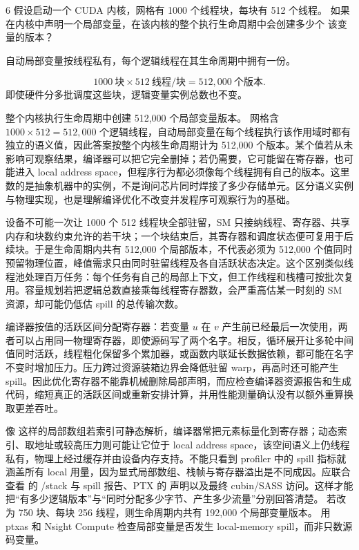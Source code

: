 \begin{solutionexercise}{6}
\problemheading 假设启动一个 CUDA 内核，网格有 1000 个线程块，每块有 512 个线程。
如果在内核中声明一个局部变量，在该内核的整个执行生命周期中会创建多少个
该变量的版本？

\approachheading 自动局部变量按线程私有，每个逻辑线程在其生命周期中拥有一份。

\answerheading
\[
1000\ \text{块}\times512\ \text{线程/块}=512{,}000\ \text{个版本}.
\]
即使硬件分多批调度这些块，逻辑变量实例总数也不变。

\conclusionheading 整个内核执行生命周期中创建 512,000 个局部变量版本。
\discussionheading
{}
网格含 $1000\times512=512{,}000$ 个逻辑线程，自动局部变量在每个线程执行该作用域时都有独立的语义值，因此答案按整个内核生命周期计为 512,000 个版本。某个值若从未影响可观察结果，编译器可以把它完全删掉；若仍需要，它可能留在寄存器，也可能进入 local address space，但程序行为都必须像每个线程拥有自己的版本。这里数的是抽象机器中的实例，不是询问芯片同时焊接了多少存储单元。区分语义实例与物理实现，也是理解编译优化不改变并发程序可观察行为的基础。

设备不可能一次让 1000 个 512 线程块全部驻留，SM 只接纳线程、寄存器、共享内存和块数约束允许的若干块；一个块结束后，其寄存器和调度状态便可复用于后续块。于是生命周期内共有 512,000 个局部版本，不代表必须为 512,000 个值同时预留物理位置，峰值需求只由同时驻留线程及各自活跃状态决定。这个区别类似线程池处理百万任务：每个任务有自己的局部上下文，但工作线程和栈槽可按批次复用。容量规划若把逻辑总数直接乘每线程寄存器数，会严重高估某一时刻的 SM 资源，却可能仍低估 spill 的总传输次数。

编译器按值的活跃区间分配寄存器：若变量 $u$ 在 $v$ 产生前已经最后一次使用，两者可以占用同一物理寄存器，即使源码写了两个名字。相反，循环展开让多轮中间值同时活跃，线程粗化保留多个累加器，或函数内联延长数据依赖，都可能在名字不变时增加压力。压力跨过资源装箱边界会降低驻留 warp，再高时还可能产生 spill。因此优化寄存器不能靠机械删除局部声明，而应检查编译器资源报告和生成代码，缩短真正的活跃区间或重新安排计算，并用性能测量确认没有以额外重算换取更差吞吐。

像  这样的局部数组若索引可静态解析，编译器常把元素标量化到寄存器；动态索引、取地址或较高压力则可能让它位于 local address space，该空间语义上仍线程私有，物理上经过缓存并由设备内存支持。不能只看到 profiler 中的 spill 指标就涵盖所有 local 用量，因为显式局部数组、栈帧与寄存器溢出是不同成因。应联合查看  的 /stack 与 spill 报告、PTX 的  声明以及最终 cubin/SASS 访问。这样才能把“有多少逻辑版本”与“同时分配多少字节、产生多少流量”分别回答清楚。
\variantheading 若改为 750 块、每块 256 线程，则生命周期内共有 192,000 个局部变量版本。
\practiceheading 用 ptxas 和 Nsight Compute 检查局部变量是否发生 local-memory spill，而非只数源码变量。
\end{solutionexercise}

